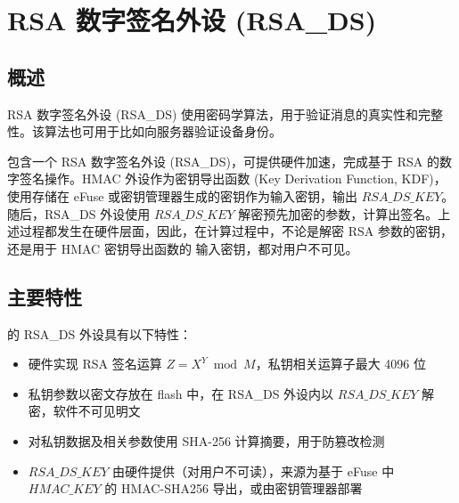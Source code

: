 \documentclass[main\_\_CN.tex]{subfiles}
\begin{document}
\setchineseformatting


\ifglobal
\else
    \clearpage
    \listoftodos
    \listofdonetodos
    \tableofcontents
\fi



\chapter{RSA 数字签名外设 (RSA\_DS)}
\label{mod:rsads}
\hypertarget{digsig}{}\hypertarget{rsads}{}

\section{概述}

RSA 数字签名外设 (RSA\_DS) 使用密码学算法，用于验证消息的真实性和完整性。该算法也可用于比如向服务器验证设备身份。

\chipname{} 包含一个 RSA 数字签名外设 (RSA\_DS)，可提供硬件加速，完成基于 RSA 的数字签名操作。HMAC 外设作为密钥导出函数 (Key Derivation Function, KDF)，使用存储在 eFuse 或密钥管理器生成的密钥作为输入密钥，输出 \begin{math}RSA\_DS\_KEY\end{math}。随后，RSA\_DS 外设使用 \begin{math}RSA\_DS\_KEY\end{math} 解密预先加密的参数，计算出签名。上述过程都发生在硬件层面，因此，在计算过程中，不论是解密 RSA 参数的密钥，还是用于 HMAC 密钥导出函数的
输入密钥，都对用户不可见。

\section{主要特性}

\chipname{} 的 RSA\_DS 外设具有以下特性：

\begin{itemize}
\item 硬件实现 RSA 签名运算 \begin{math}Z = X^{Y} \bmod M\end{math}，私钥相关运算子最大 4096 位
\item 私钥参数以密文存放在 flash 中，在 RSA\_DS 外设内以 \begin{math}RSA\_DS\_KEY\end{math} 解密，软件不可见明文
\item 对私钥数据及相关参数使用 SHA-256 计算摘要，用于防篡改检测
\item \begin{math}RSA\_DS\_KEY\end{math} 由硬件提供（对用户不可读），来源为基于 eFuse 中 \begin{math}HMAC\_KEY\end{math} 的 HMAC-SHA256 导出，或由密钥管理器部署
\end{itemize}
\end{document}
